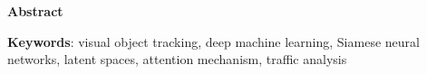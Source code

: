 \thispagestyle{plain}

\begin{center}
    \Large{\textbf{Abstract}}
\end{center}


\noindent \textbf{Keywords}: visual object tracking, deep machine learning, Siamese neural networks, latent spaces, attention mechanism, traffic analysis
